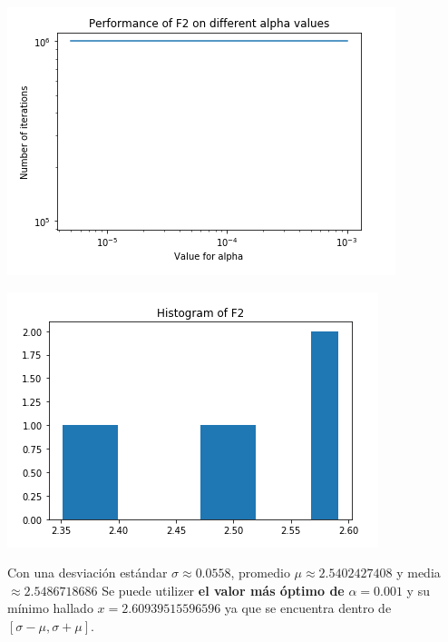 \documentclass[10pt,letterpaper]{article}
\begin{document}
\begin{enumerate}
\begin{enumerate}
                    \begin{multicols}{2}
                        \begin{center}
                            \includegraphics[scale=.45]{assets/theory/1-a/f2-performance.png}
                        \end{center}
                        \begin{center}
                            \includegraphics[scale=.45]{assets/theory/1-a/f2-dist.png}
                        \end{center}
                    \end{multicols}

                    Con una desviación estándar $\sigma \approx 0.0558$,
                    promedio $\mu \approx 2.5402427408$ y media $\approx 2.5486718686$
                    Se puede utilizer \textbf{el valor más óptimo de} $\alpha = 0.001$ y
                    su mínimo hallado $x=2.60939515596596$ ya que se encuentra dentro de
                    $[\sigma - \mu, \sigma + \mu]$.


\end{enumerate}
\end{enumerate}
\end{document}
